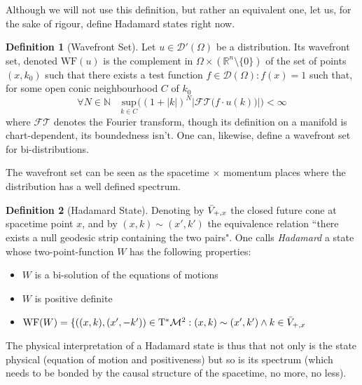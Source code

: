 \documentclass[a4paper,11pt]{article}
\numberwithin{equation}{section}
\theoremstyle{definition}
\newtheorem{definition}{Definition}
\begin{document}
Although we will not use this definition, but rather an equivalent one, let us, for the sake of rigour, define Hadamard states right now.
\begin{definition}[Wavefront Set]
    Let $u \in \mathcal{D}'(\Omega)$ be a distribution. Its wavefront set, denoted $\mathrm{WF}(u)$ is the complement in $\Omega\times(\mathbb{R}^n\setminus\{0\})$ of the set of points $(x,k_0)$ such that there exists a test function $f \in \mathcal{D}(\Omega): f(x)=1$  such that, for some open conic neighbourhood $C$ of $k_0$
    \begin{equation}
    \forall N \in \mathbb{N} \quad \underset{k\in C}{\mathrm{sup}} \Big((1+|k|)^N \left|\mathcal{FT} \big(f\cdot u(k)\big)\right|\Big) <\infty
    \end{equation}
    where $\mathcal{FT}$ denotes the Fourier transform, though its definition on a manifold is chart-dependent, its boundedness isn't.
    One can, likewise, define a wavefront set for bi-distributions.
\end{definition}
The wavefront set can be seen as the spacetime $\times$ momentum places where the distribution has a well defined spectrum.
\begin{definition}[Hadamard State]\label{HadDef}
    Denoting by $\Bar{V}_{+,x}$ the closed future cone at spacetime point $x$, and by $(x,k)\sim(x',k')$ the equivalence relation ``there exists a null geodesic strip containing the two pairs". One calls \emph{Hadamard} a state whose two-point-function $W$ has the following properties:
    \begin{itemize}
        \item $W$ is a bi-solution of the equations of motions
        \item $W$ is positive definite
        \item $\mathrm{WF}(W)=\{ ((x,k),(x',-k'))\in \mathrm{T}^*\mathcal{M}^2 : (x,k)\sim(x',k')\wedge k \in \Bar{V}_{+,x}$
    \end{itemize}
\end{definition}
The physical interpretation of a Hadamard state is thus that not only is the state physical (equation of motion and positiveness) but so is its spectrum (which needs to be bonded by the causal structure of the spacetime, no more, no less).
\end{document}
